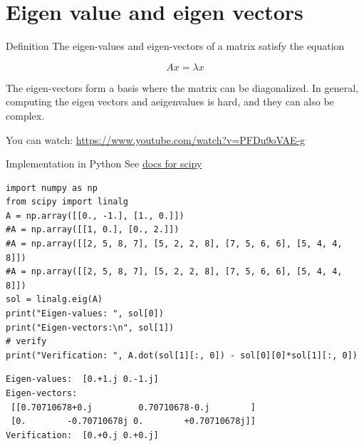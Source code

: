 \documentclass[xcolor=svgnames,t,10pt,allowframebreaks]{beamer}
\begin{document}
\section{Eigen value and eigen vectors}
\label{sec:org693ffc9}
\begin{frame}[label={sec:orgb97294f}]{Definition}
\vfill
The eigen-values and eigen-vectors of a matrix satisfy the equation 

$$ Ax = \lambda x $$


The eigen-vectors form a basis where the matrix can be
diagonalized. In general, computing the eigen vectors and
aeigenvalues is hard, and they can also be complex.
\vfill

You can watch: \url{https://www.youtube.com/watch?v=PFDu9oVAE-g}
\end{frame}
\begin{frame}[fragile,label={sec:org7408179}]{Implementation in Python}
 See \href{https://docs.scipy.org/doc/scipy/reference/generated/scipy.linalg.eig.html\#scipy.linalg.eig}{docs for scipy}

\begin{verbatim}
import numpy as np
from scipy import linalg
A = np.array([[0., -1.], [1., 0.]])
#A = np.array([[1, 0.], [0., 2.]])
#A = np.array([[2, 5, 8, 7], [5, 2, 2, 8], [7, 5, 6, 6], [5, 4, 4, 8]])
#A = np.array([[2, 5, 8, 7], [5, 2, 2, 8], [7, 5, 6, 6], [5, 4, 4, 8]])
sol = linalg.eig(A)
print("Eigen-values: ", sol[0])
print("Eigen-vectors:\n", sol[1])
# verify
print("Verification: ", A.dot(sol[1][:, 0]) - sol[0][0]*sol[1][:, 0])
\end{verbatim}

{\scriptsize
\begin{verbatim}
Eigen-values:  [0.+1.j 0.-1.j]
Eigen-vectors:
 [[0.70710678+0.j         0.70710678-0.j        ]
 [0.        -0.70710678j 0.        +0.70710678j]]
Verification:  [0.+0.j 0.+0.j]
\end{verbatim}
}
\end{frame}
\end{document}

